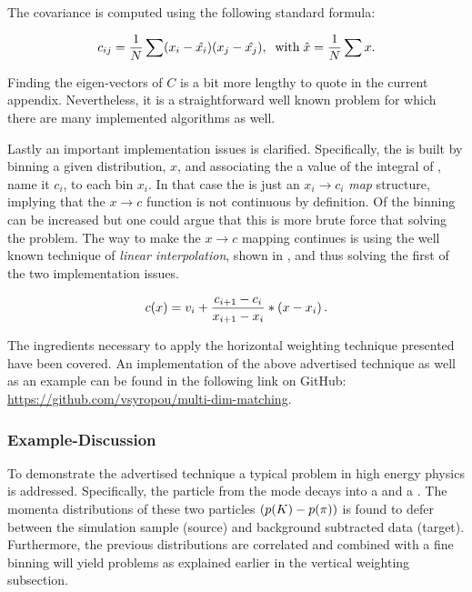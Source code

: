 \noindent The covariance is computed using the following standard formula:

\begin{equation}
\centering
c_{ij} = \frac{1}{N} \sum (x_i-\hat{x_i})(x_j-\hat{x_j}), \;\; \text {with} \; \hat{x} = \frac{1}{N} \sum x.
\label{hor_reww_correlation_formula}
\end{equation}

\noindent Finding the eigen-vectors of $C$ is a bit more lengthy to quote in the current appendix.
Nevertheless, it is a straightforward well known problem for which there are many implemented
algorithms as well.

Lastly an important implementation issues is clarified. Specifically, the \cdf is built by binning a
given distribution, $x$, and associating the a value of the integral of , name it $c_i$,
to each bin $x_i$. In that case  the \cdf is just an $x_i \to c_i$ {\it map}
structure, implying that the $x \to c$ function is not continuous by definition. Of the binning can be increased
but one could argue that this is more brute force that solving the problem. The way to make the $x \to c$ mapping
continues is using the well known technique of {\it linear interpolation}, shown in ,
and thus solving the first of the two implementation issues.

\begin{equation}
  c(x) = v_i + \frac{c_{i+1}-c_i}{x_{i+1}-x_i} *  \left( x - x_i \right).
  \label{linear_interpolation}
\end{equation}

The ingredients necessary to apply the horizontal weighting technique presented have been covered.
An implementation of the above advertised technique as well as an example can be found in the following
link on GitHub: \href{https://github.com/vsyropou/multi-dim-matching}{https://github.com/vsyropou/multi-dim-matching}.

\subsubsection{Example-Discussion}
To demonstrate the advertised technique a typical problem in high energy physics is addressed.
Specifically, the \Kstarz particle from the \BsJpsiKst mode decays into a \kaon and a \pion. The momenta
distributions of these two particles $\left( \mbox{$p$}(K)-\mbox{$p$}(\pi) \right)$ is found to defer between
the simulation sample (source) and background subtracted data (target).
Furthermore, the previous distributions are correlated and combined with a fine binning will yield problems as explained
earlier in the vertical weighting subsection.

